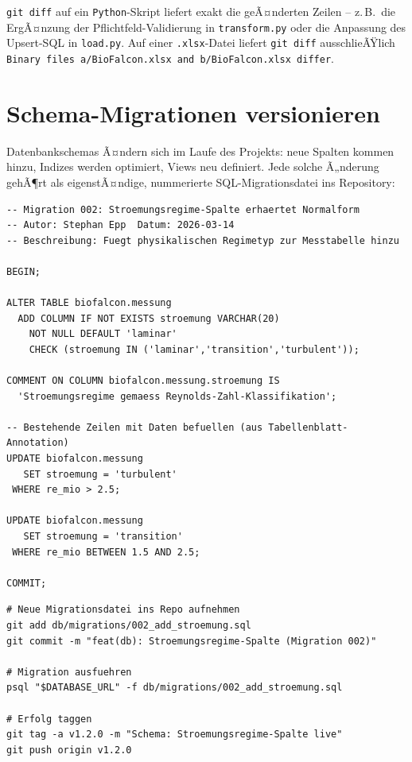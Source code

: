 ﻿\documentclass[12pt,a4paper]{report}
\theoremstyle{definition}
\theoremstyle{remark}
\newcommand{\py}{\texttt{Python}}
\newcommand{\code}[1]{\texttt{#1}}
\begin{document}
\code{git diff} auf ein \py-Skript liefert exakt die geÃ¤nderten Zeilen --
z.\,B.\ die ErgÃ¤nzung der Pflichtfeld-Validierung in \code{transform.py}
oder die Anpassung des Upsert-SQL in \code{load.py}. Auf einer
\code{.xlsx}-Datei liefert \code{git diff} ausschlieÃŸlich
\code{Binary files a/BioFalcon.xlsx and b/BioFalcon.xlsx differ}.

\section{Schema-Migrationen versionieren}

Datenbankschemas Ã¤ndern sich im Laufe des Projekts: neue Spalten kommen
hinzu, Indizes werden optimiert, Views neu definiert.
Jede solche Ã„nderung gehÃ¶rt als eigenstÃ¤ndige, nummerierte
SQL-Migrationsdatei ins Repository:

\begin{lstlisting}[style=sql, caption={db/migrations/002\_add\_stroemung.sql}]
-- Migration 002: Stroemungsregime-Spalte erhaertet Normalform
-- Autor: Stephan Epp  Datum: 2026-03-14
-- Beschreibung: Fuegt physikalischen Regimetyp zur Messtabelle hinzu

BEGIN;

ALTER TABLE biofalcon.messung
  ADD COLUMN IF NOT EXISTS stroemung VARCHAR(20)
    NOT NULL DEFAULT 'laminar'
    CHECK (stroemung IN ('laminar','transition','turbulent'));

COMMENT ON COLUMN biofalcon.messung.stroemung IS
  'Stroemungsregime gemaess Reynolds-Zahl-Klassifikation';

-- Bestehende Zeilen mit Daten befuellen (aus Tabellenblatt-Annotation)
UPDATE biofalcon.messung
   SET stroemung = 'turbulent'
 WHERE re_mio > 2.5;

UPDATE biofalcon.messung
   SET stroemung = 'transition'
 WHERE re_mio BETWEEN 1.5 AND 2.5;

COMMIT;
\end{lstlisting}

\begin{lstlisting}[style=bash, caption={Migrationsdatei committen und deployen}]
# Neue Migrationsdatei ins Repo aufnehmen
git add db/migrations/002_add_stroemung.sql
git commit -m "feat(db): Stroemungsregime-Spalte (Migration 002)"

# Migration ausfuehren
psql "$DATABASE_URL" -f db/migrations/002_add_stroemung.sql

# Erfolg taggen
git tag -a v1.2.0 -m "Schema: Stroemungsregime-Spalte live"
git push origin v1.2.0
\end{lstlisting}
\end{document}
